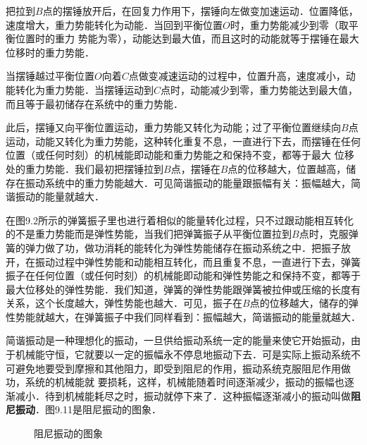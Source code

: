 把拉到$B$点的摆锤放开后，在回复力作用下，摆锤向左做变加速运动．位置降低，速度增大，重力势能转化为动能．当回到平衡位置$O$时，重力势能减少到零（取平衡位置时的重力
势能为零），动能达到最大值，而且这时的动能就等于摆锤在最大位移时的重力势能．

当摆锤越过平衡位置$O$向着$C$点做变减速运动的过程中，位置升高，速度减小，动能转化为重力势能．当摆锤运动到$C$点时，动能减少到零，重力势能达到最大值，而且等于最初储存在系统中的重力势能．

此后，摆锤又向平衡位置运动，重力势能又转化为动能；过了平衡位置继续向$B$点运动，动能又转化为重力势能，这种转化重复不息，一直进行下去，而摆锤在任何位置（或任何时刻）的机械能即动能和重力势能之和保持不变，都等于最大
位移处的重力势能．我们最初把摆锤拉到$B$点，摆锤在$B$点的位移越大，位置越高，储存在振动系统中的重力势能越大．可见简谐振动的能量跟振幅有关：振幅越大，简谐振动的能量就越大．

在图9.2所示的弹簧振子里也进行着相似的能量转化过程，只不过跟动能相互转化的不是重力势能而是弹性势能，当我们把弹簧振子从平衡位置拉到$B$点时，克服弹簧的弹力做了功，做功消耗的能转化为弹性势能储存在振动系统之中．把振子放开，在振动过程中弹性势能和动能相互转化，而且重复不息，一直进行下去，弹簧振子在任何位置（或任何时刻）的机械能即动能和弹性势能之和保持不变，都等于最大位移处的弹性势能．我们知道，弹簧的弹性势能跟弹簧被拉伸或压缩的长度有关系，这个长度越大，弹性势能也越大．可见，振子在$B$点的位移越大，储存的弹性势能就越大，在弹簧振子中我们同样看到：振幅越大，简谐振动的能量就越大．

简谐振动是一种理想化的振动，一旦供给振动系统一定的能量来使它开始振动，由于机械能守恒，它就要以一定的振幅永不停息地振动下去．可是实际上振动系统不可避免地要受到摩擦和其他阻力，即受到阻尼的作用，振动系统克服阻尼作用做功，系统的机械能就
要损耗，这样，机械能随着时间逐渐减少，振动的振幅也逐渐减小．待到机械能耗尽之时，振动就停下来了．这种振幅逐渐减小的振动叫做\textbf{阻尼振动}．图9.11是阻尼振动的图象．

\begin{figure}\centering
    \caption{阻尼振动的图象}
\end{figure}

